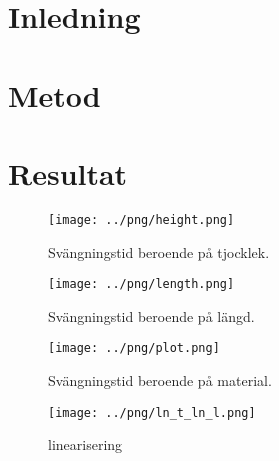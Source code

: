 \documentclass[10pt, titlepage, oneside, a4paper]{article}
\begin{document}
    
	\section{Inledning}
	\section{Metod}
	\section{Resultat}
    \begin{center}
        \begin{figure}[h]
            \centering
            \texttt{[image: ../png/height.png]}
            \caption{Svängningstid beroende på tjocklek.}
            \label{height}
        \end{figure}
        \begin{figure}
            \centering
            \texttt{[image: ../png/length.png]}
            \caption{Svängningstid beroende på längd.}
            \label{length}
        \end{figure}
        \begin{figure}
            \centering
            \texttt{[image: ../png/plot.png]}
            \caption{Svängningstid beroende på material.}
            \label{material}
        \end{figure}
        \begin{figure}
            \centering
            \texttt{[image: ../png/ln\_t\_ln\_l.png]}
            \caption{linearisering}
            \label{linearisering}
        \end{figure}
    \end{center}
\end{document}
